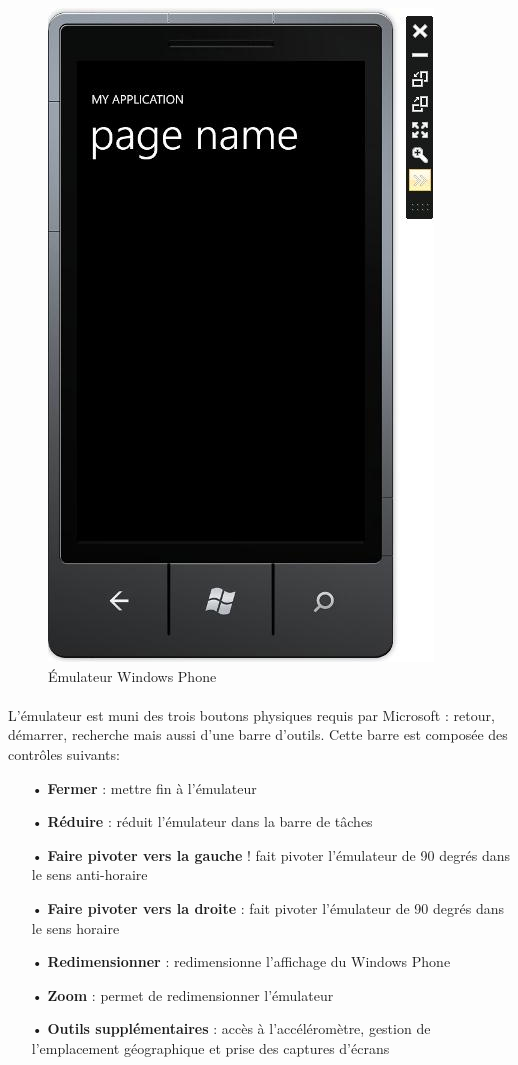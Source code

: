 \documentclass[twoside,UTF8]{EPURapport}
\begin{document}
\begin{figure}[H]
\center
\includegraphics[scale=0.7]{images/emulateur.jpg}
\caption{\'Emulateur Windows Phone}
\end{figure}

\paragraph{}
L'émulateur est muni des trois boutons physiques requis par Microsoft : retour, démarrer, recherche mais aussi d'une barre d'outils. Cette barre est composée des contrôles suivants: 
\begin{itemize}
	\item[•]\textbf{Fermer} : mettre fin à l'émulateur
	\item[•]\textbf{Réduire} : réduit l'émulateur dans la barre de tâches
	\item[•]\textbf{Faire pivoter vers la gauche} ! fait pivoter l'émulateur de 90 degrés dans le sens anti-horaire
	\item[•]\textbf{Faire pivoter vers la droite} : fait pivoter l'émulateur de 90 degrés dans le sens horaire
	\item[•]\textbf{Redimensionner} : redimensionne l'affichage du Windows Phone
	\item[•]\textbf{Zoom} : permet de redimensionner l'émulateur
	\item[•]\textbf{Outils supplémentaires} : accès à l'accéléromètre, gestion de l'emplacement géographique et prise des captures d'écrans
\end{itemize}
\end{document}
